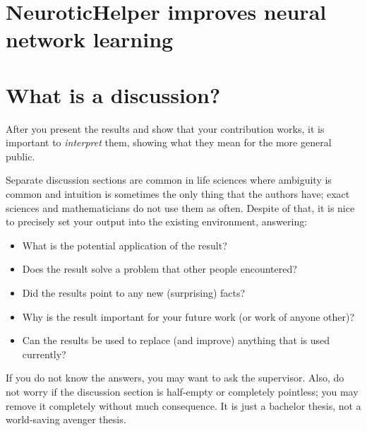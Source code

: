 \section{NeuroticHelper improves neural network learning}

\section{What is a discussion?}
After you present the results and show that your contribution works, it is important to \emph{interpret} them, showing what they mean for the more general public.

Separate discussion sections are common in life sciences where ambiguity is common and intuition is sometimes the only thing that the authors have; exact sciences and mathematicians do not use them as often. Despite of that, it is nice to precisely set your output into the existing environment, answering:
\begin{itemize}
\item What is the potential application of the result?
\item Does the result solve a problem that other people encountered?
\item Did the results point to any new (surprising) facts?
\item Why is the result important for your future work (or work of anyone other)?
\item Can the results be used to replace (and improve) anything that is used currently?
\end{itemize}

If you do not know the answers, you may want to ask the supervisor. Also, do not worry if the discussion section is half-empty or completely pointless; you may remove it completely without much consequence. It is just a bachelor thesis, not a world-saving avenger thesis.
